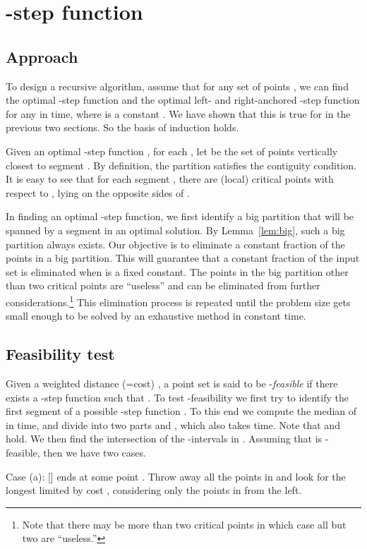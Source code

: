 \documentclass[preprint,10pt]{elsarticle}
\begin{document}
\section{-step function}\label{sec:kstep}
\subsection{Approach}
To design a recursive algorithm, assume that for any set of points ,
we can find the optimal -step function and the optimal left- and right-anchored -step function 
for any  in  time,
where  is a constant .
We have shown that this is true for  in the previous two sections.
So the basis of induction holds.

Given an optimal -step function , for each ,
let  be the set of points vertically closest to segment .
By definition, the partition
 satisfies the contiguity condition.
It is easy to see that
for each segment , there are (local) critical points with respect to ,
lying on the opposite sides of .

In finding an optimal -step function,
we first identify a big partition that will be spanned by a segment in
an optimal solution.
By Lemma~\ref{lem:big},
such a big partition always exists.
Our objective is to eliminate a constant fraction of the points in a big partition.
This will guarantee that a constant fraction of the input set is eliminated when  is a fixed constant.
The points in the big partition other than two critical points are ``useless''
and can be eliminated from further considerations.\footnote{Note that there may
be more than two critical points in which case all but two are ``useless.''}
This elimination process is repeated until the problem size gets small enough
to be solved by an exhaustive method in constant time.

\subsection{Feasibility test}\label{sec:feasibility}
Given a weighted distance (=cost) ,
a point set  is said to be -{\em feasible} if there exists a -step function
 such that . 
To test -feasibility
we first try to identify the first segment  of a possible -step function .
To this end we compute the median  of  in  time,
and divide  into two parts  and ,
which also takes  time.
Note that  and  hold.
We then find the intersection  of the -intervals in .
Assuming that  is -feasible,
then we have two cases.

Case (a): []  ends at some point .
Throw away all the points in  and look for the longest  limited by cost ,
considering only the points in  from the left.
\end{document}
